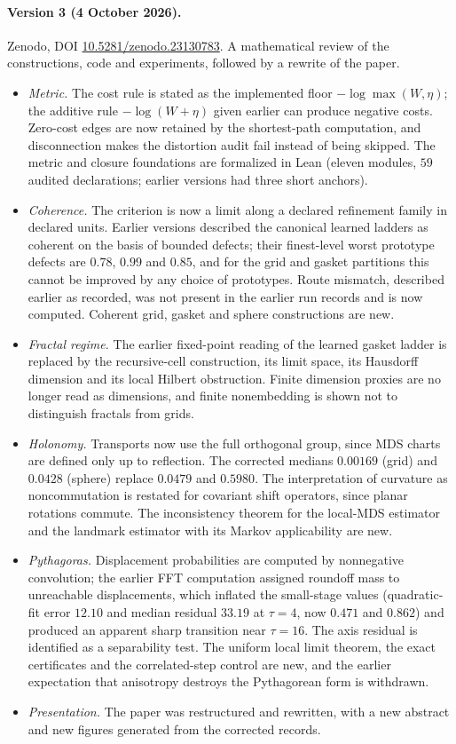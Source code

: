 \documentclass[11pt]{article}
\begin{document}
\paragraph{Version 3 (4 October 2026).}
Zenodo, DOI \href{https://doi.org/10.5281/zenodo.23130783}{10.5281/zenodo.23130783}.
A mathematical review of the constructions, code and experiments, followed by a rewrite of the paper.
\begin{itemize}[leftmargin=*]
\item \emph{Metric.} The cost rule is stated as the implemented floor $-\log\max(W,\eta)$; the additive rule $-\log(W+\eta)$ given earlier can produce negative costs. Zero-cost edges are now retained by the shortest-path computation, and disconnection makes the distortion audit fail instead of being skipped. The metric and closure foundations are formalized in Lean (eleven modules, $59$ audited declarations; earlier versions had three short anchors).
\item \emph{Coherence.} The criterion is now a limit along a declared refinement family in declared units. Earlier versions described the canonical learned ladders as coherent on the basis of bounded defects; their finest-level worst prototype defects are $0.78$, $0.99$ and $0.85$, and for the grid and gasket partitions this cannot be improved by any choice of prototypes. Route mismatch, described earlier as recorded, was not present in the earlier run records and is now computed. Coherent grid, gasket and sphere constructions are new.
\item \emph{Fractal regime.} The earlier fixed-point reading of the learned gasket ladder is replaced by the recursive-cell construction, its limit space, its Hausdorff dimension and its local Hilbert obstruction. Finite dimension proxies are no longer read as dimensions, and finite nonembedding is shown not to distinguish fractals from grids.
\item \emph{Holonomy.} Transports now use the full orthogonal group, since MDS charts are defined only up to reflection. The corrected medians $0.00169$ (grid) and $0.0428$ (sphere) replace $0.0479$ and $0.5980$. The interpretation of curvature as noncommutation is restated for covariant shift operators, since planar rotations commute. The inconsistency theorem for the local-MDS estimator and the landmark estimator with its Markov applicability are new.
\item \emph{Pythagoras.} Displacement probabilities are computed by nonnegative convolution; the earlier FFT computation assigned roundoff mass to unreachable displacements, which inflated the small-stage values (quadratic-fit error $12.10$ and median residual $33.19$ at $\tau=4$, now $0.471$ and $0.862$) and produced an apparent sharp transition near $\tau=16$. The axis residual is identified as a separability test. The uniform local limit theorem, the exact certificates and the correlated-step control are new, and the earlier expectation that anisotropy destroys the Pythagorean form is withdrawn.
\item \emph{Presentation.} The paper was restructured and rewritten, with a new abstract and new figures generated from the corrected records.
\end{itemize}
 
\end{document}
